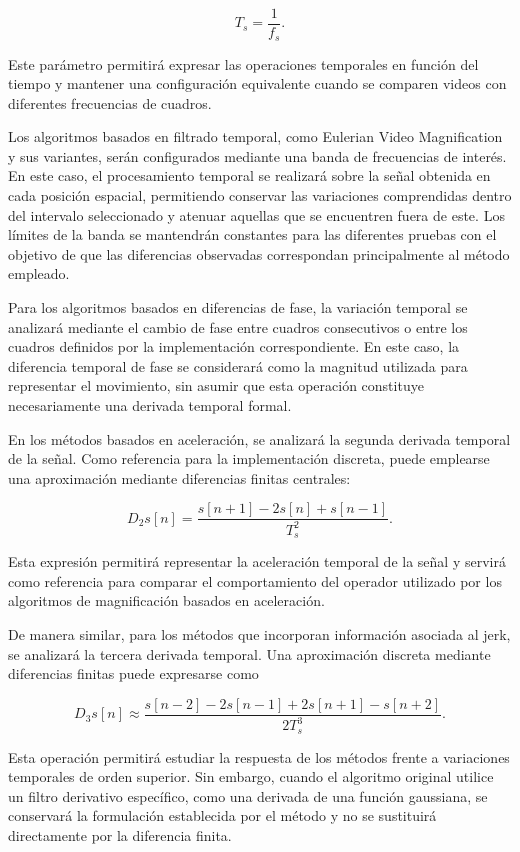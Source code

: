 $$
T_s=\frac{1}{f_s}.
$$

Este parámetro permitirá expresar las operaciones temporales en función del tiempo y mantener una configuración equivalente cuando se comparen videos con diferentes frecuencias de cuadros.

Los algoritmos basados en filtrado temporal, como Eulerian Video Magnification y sus variantes, serán configurados mediante una banda de frecuencias de interés. En este caso, el procesamiento temporal se realizará sobre la señal obtenida en cada posición espacial, permitiendo conservar las variaciones comprendidas dentro del intervalo seleccionado y atenuar aquellas que se encuentren fuera de este. Los límites de la banda se mantendrán constantes para las diferentes pruebas con el objetivo de que las diferencias observadas correspondan principalmente al método empleado.

Para los algoritmos basados en diferencias de fase, la variación temporal se analizará mediante el cambio de fase entre cuadros consecutivos o entre los cuadros definidos por la implementación correspondiente. En este caso, la diferencia temporal de fase se considerará como la magnitud utilizada para representar el movimiento, sin asumir que esta operación constituye necesariamente una derivada temporal formal.

En los métodos basados en aceleración, se analizará la segunda derivada temporal de la señal. Como referencia para la implementación discreta, puede emplearse una aproximación mediante diferencias finitas centrales:

$$
D_2s[n]=
\frac{s[n+1]-2s[n]+s[n-1]}{T_s^2}.
$$

Esta expresión permitirá representar la aceleración temporal de la señal y servirá como referencia para comparar el comportamiento del operador utilizado por los algoritmos de magnificación basados en aceleración.

De manera similar, para los métodos que incorporan información asociada al jerk, se analizará la tercera derivada temporal. Una aproximación discreta mediante diferencias finitas puede expresarse como

$$
D_3s[n]\approx
\frac{s[n-2]-2s[n-1]+2s[n+1]-s[n+2]}
{2T_s^3}.
$$

Esta operación permitirá estudiar la respuesta de los métodos frente a variaciones temporales de orden superior. Sin embargo, cuando el algoritmo original utilice un filtro derivativo específico, como una derivada de una función gaussiana, se conservará la formulación establecida por el método y no se sustituirá directamente por la diferencia finita.

